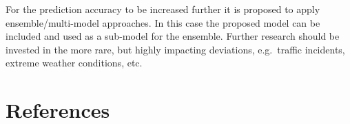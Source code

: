 \documentclass[preprint,11pt,5p,twocolumn]{elsarticle}
\begin{document}
For the prediction accuracy to be increased further it is proposed to apply ensemble/multi-model approaches. In this case the proposed model can be included and used as a sub-model for the ensemble. Further research should be invested in the more rare, but highly impacting deviations, e.g.\ traffic incidents, extreme weather conditions, etc.

\section*{References}

%

\end{document}
